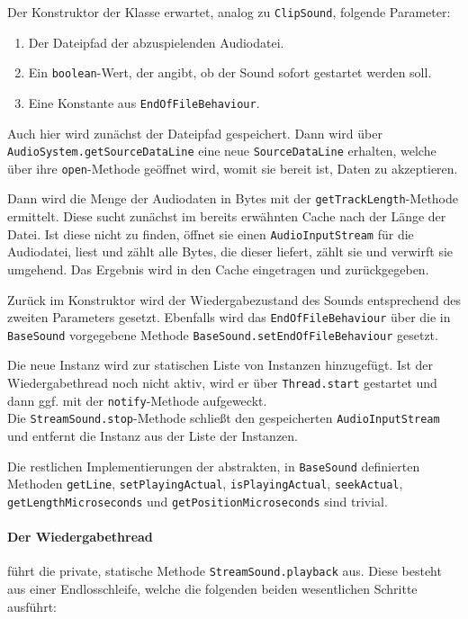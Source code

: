 \begin{sloppypar}
Der Konstruktor der Klasse erwartet, analog zu \texttt{ClipSound},
folgende Parameter:

\begin{enumerate}
	\item Der Dateipfad der abzuspielenden Audiodatei.
	\item Ein \texttt{boolean}-Wert, der angibt, ob der
	      Sound sofort gestartet werden soll.
	\item Eine Konstante aus \texttt{EndOfFileBehaviour}.
\end{enumerate}

Auch hier wird zunächst der Dateipfad gespeichert. Dann wird über
\texttt{AudioSystem.getSourceDataLine} eine neue \texttt{SourceDataLine}
erhalten, welche über ihre \texttt{open}-Methode geöffnet wird,
womit sie bereit ist, Daten zu akzeptieren.

Dann wird die Menge der Audiodaten in Bytes mit der \texttt{getTrackLength}-Methode
ermittelt. Diese sucht zunächst im bereits erwähnten Cache nach der Länge der
Datei. Ist diese nicht zu finden, öffnet sie einen \texttt{AudioInputStream} für
die Audiodatei, liest und zählt alle Bytes, die dieser liefert, zählt
sie und verwirft sie umgehend. Das Ergebnis wird in den Cache eingetragen und
zurückgegeben.

Zurück im Konstruktor wird der Wiedergabezustand des Sounds
entsprechend des zweiten Parameters gesetzt. Ebenfalls wird
das \texttt{EndOfFileBehaviour} über die in \texttt{BaseSound}
vorgegebene Methode \texttt{BaseSound.setEndOfFileBehaviour}
gesetzt.

Die neue Instanz wird zur statischen Liste von Instanzen hinzugefügt.
Ist der Wiedergabethread noch nicht aktiv, wird er über
\texttt{Thread.start} gestartet und dann ggf. mit der
\texttt{notify}-Methode aufgeweckt.
\\

Die \texttt{StreamSound.stop}-Methode schließt den gespeicherten
\texttt{AudioInputStream} und entfernt die Instanz aus der Liste
der Instanzen.

Die restlichen Implementierungen der abstrakten, in \texttt{BaseSound}
definierten Methoden \texttt{getLine}, \texttt{setPlayingActual},
\texttt{isPlayingActual}, \texttt{seekActual}, \texttt{getLengthMicroseconds}
und \texttt{getPositionMicroseconds} sind trivial.

\paragraph{Der Wiedergabethread} führt die private, statische Methode
\texttt{StreamSound.playback} aus. Diese besteht aus einer Endlosschleife,
welche die folgenden beiden wesentlichen Schritte ausführt:


\end{sloppypar}
